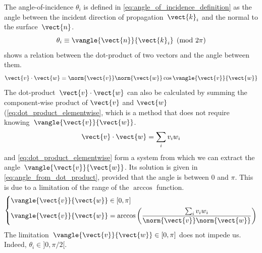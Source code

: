 The angle-of-incidence $\theta_i$ is defined in \cref{eq:angle_of_incidence_definition} as the angle between the incident direction of propagation~$\vect{k}_i$ and the normal to the surface~$\vect{n}$.
\begin{equation}
    \theta_i \equiv \vangle{\vect{n}}{\vect{k}_i} \pmod{2\pi}
    \label{eq:angle_of_incidence_definition}
\end{equation}
 shows a relation between the dot-product of two vectors and the angle between them.
\begin{equation}
    \vect{v} \cdot \vect{w} = \norm{\vect{v}} \norm{\vect{w}} \cos \vangle{\vect{v}}{\vect{w}}
    \label{eq:dot_product_cos}
\end{equation}
The dot-product~$\vect{v} \cdot \vect{w}$ can also be calculated by summing the component-wise product of $\vect{v}$ and $\vect{w}$ (\cref{eq:dot_product_elementwise}, which is a method that does not require knowing~$\vangle{\vect{v}}{\vect{w}}$.
\begin{equation}
    \vect{v} \cdot \vect{w} = \sum_i v_i w_i
    \label{eq:dot_product_elementwise}
\end{equation}
 and \cref{eq:dot_product_elementwise} form a system from which we can extract the angle~$\vangle{\vect{v}}{\vect{w}}$.
Its solution is given in \cref{eq:angle_from_dot_product}, provided that the angle is between 0 and $\pi$.
This is due to a limitation of the range of the $\arccos$ function.
\begin{equation}
    \left\lbrace
        \begin{aligned}
            \vangle{\vect{v}}{\vect{w}} &\in [0, \pi]
            \\
            \vangle{\vect{v}}{\vect{w}} &= \arccos
            \left(
                \frac{
                    \sum_i v_i w_i
                }{
                    \norm{\vect{v}} \norm{\vect{w}}
                }
            \right)
        \end{aligned}
    \right.
    \label{eq:angle_from_dot_product}
\end{equation}
The limitation~$\vangle{\vect{v}}{\vect{w}} \in [0, \pi]$ does not impede us.
Indeed, $\theta_i \in ]0, \pi/2[$.
